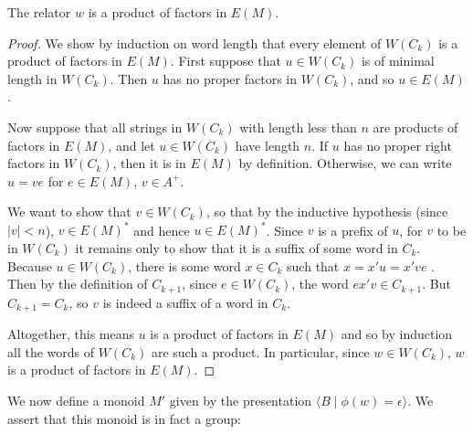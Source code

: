 \documentclass[noindex,noinsetproof,12pt]{lmaths}
\begin{document}
\begin{prop} \label{lma:relator-factors-E(M)}
	The relator $w$ is a product of factors in $E(M)$.
\end{prop}
\begin{proof}
	\hspace{-0.25mm}We show by induction on word length that every element of $W(C_k)$ is a product of factors in $E(M)$. First suppose that $u \in W(C_k)$ is of minimal length in $W(C_k)$. Then $u$ has no proper factors in $W(C_k)$, and so $u \in E(M)$.

	Now suppose that all strings in $W(C_k)$ with length less than $n$ are products of factors in $E(M)$, and let $u \in W(C_k)$ have length $n$. If $u$ has no proper right factors in $W(C_k)$, then it is in $E(M)$ by definition. Otherwise, we can write $u = ve$ for $e \in E(M)$, $v \in A^+$.

	We want to show that $v \in W(C_k)$, so that by the inductive hypothesis (since $|v| < n$), $v \in E(M)^*$ and hence $u \in E(M)^*$. Since $v$ is a prefix of $u$, for $v$ to be in $W(C_k)$ it remains only to show that it is a suffix of some word in $C_k$. Because $u \in W(C_k)$, there is some word $x \in C_k$ such that $x = x'u = x've$ . Then by the definition of $C_{k+1}$, since $e \in W(C_k)$, the word $ex'v \in C_{k+1}$. But $C_{k+1} = C_k$, so $v$ is indeed a suffix of a word in $C_k$.

	Altogether, this means $u$ is a product of factors in $E(M)$ and so by induction all the words of $W(C_k)$ are such a product. In particular, since $w \in W(C_k)$, $w$ is a product of factors in $E(M)$.
\end{proof}

We now define a monoid $M'$ given by the presentation $\langle B \mid \phi(w) = \epsilon \rangle$. We assert that this monoid is in fact a group:
\end{document}
